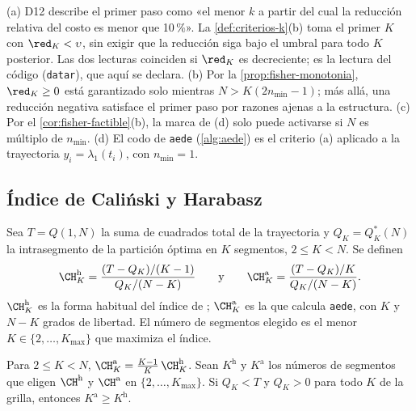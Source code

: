 \begin{observacion}\label{obs:criterios-k}
(a) D12 describe el primer paso como «el menor $k$ a partir del cual la reducción relativa del
costo es menor que 10\,\%». La \cref{def:criterios-k}(b) toma el primer $K$ con $\red_K<\upsilon$,
sin exigir que la reducción siga bajo el umbral para todo $K$ posterior. Las dos lecturas
coinciden si $\red_K$ es decreciente; es la lectura del código (\texttt{datar}), que aquí se
declara. (b) Por la \cref{prop:fisher-monotonia}, $\red_K\ge0$ está garantizado solo mientras
$N>K(2n_{\min}-1)$; más allá, una reducción negativa satisface el primer paso por razones
ajenas a la estructura. (c) Por el \cref{cor:fisher-factible}(b), la marca de (d) solo puede
activarse si $N$ es múltiplo de $n_{\min}$. (d) El codo de \texttt{aede} (\cref{alg:aede}) es el
criterio (a) aplicado a la trayectoria $y_i=\lambda_1(t_i)$, con $n_{\min}=1$.
\end{observacion}

\subsection{Índice de Caliński y Harabasz}

\begin{definicion}\label{def:ch}
Sea $T=Q(1,N)$ la suma de cuadrados total de la trayectoria y $Q_K=Q^\ast_K(N)$ la intrasegmento
de la partición óptima en $K$ segmentos, $2\le K<N$. Se definen
\[
  \CH^{\mathrm h}_K=\frac{(T-Q_K)/(K-1)}{Q_K/(N-K)}
  \qquad\text{y}\qquad
  \CH^{\mathrm a}_K=\frac{(T-Q_K)/K}{Q_K/(N-K)} .
\]
$\CH^{\mathrm h}_K$ es la forma habitual del índice de
\textcite{calinski_harabasz_1974}; $\CH^{\mathrm a}_K$ es la que calcula
\texttt{aede}, con $K$ y $N-K$ grados de libertad. El número de segmentos elegido es el menor
$K\in\{2,\dots,K_{\max}\}$ que maximiza el índice.
\end{definicion}

\begin{proposicion}\label{prop:ch}
Para $2\le K<N$, $\CH^{\mathrm a}_K=\frac{K-1}{K}\,\CH^{\mathrm h}_K$. Sean $K^{\mathrm h}$ y
$K^{\mathrm a}$ los números de segmentos que eligen $\CH^{\mathrm h}$ y $\CH^{\mathrm a}$ en
$\{2,\dots,K_{\max}\}$. Si $Q_K<T$ y $Q_K>0$ para todo $K$ de la grilla, entonces
$K^{\mathrm a}\ge K^{\mathrm h}$.
\end{proposicion}

